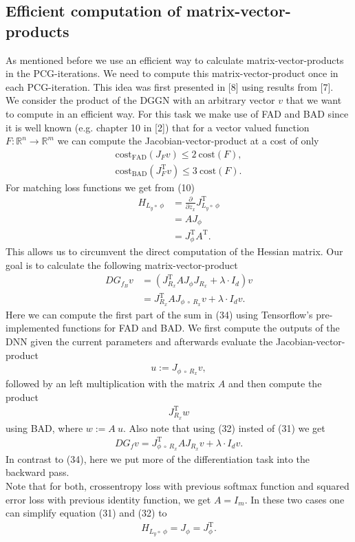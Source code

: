 \documentclass[conference]{IEEEtran}
\begin{document}
	\subsection{Efficient computation of matrix-vector-products}
	\noindent
	As mentioned before we use an efficient way to calculate matrix-vector-products in the PCG-iterations. We need to compute this matrix-vector-product once in each PCG-iteration. This idea was first presented in [8] using results from [7].\\
	We consider the product of the DGGN with an arbitrary vector $v$ that we want to compute in an efficient way.
	For this task we make use of FAD and BAD since it is well known (e.g. chapter 10 in [2]) that for a vector valued function $F:\mathbb{R}^{n}\rightarrow\mathbb{R}^{m}$ we can compute the Jacobian-vector-product at a cost of only
	\begin{align}
	\mathrm{cost}_{\text{FAD}}(J_{F}v)\leq 2\:\mathrm{cost}(F),\\
	\mathrm{cost}_{\text{BAD}}(J_{F}^{\mathrm{T}}v)\leq 3\:\mathrm{cost}(F).
	\end{align}
	For matching loss functions we get from (10)
	\begin{align}
	H_{L_{y}\circ\:\phi} &= \frac{\partial}{\partial z_{x}}J_{L_{y}\circ\:\phi}^{\mathrm{T}}\\
	&= AJ_{\phi} \\
	&= J_{\phi}^{\mathrm{T}}A^{\mathrm{T}}.
	\end{align}
	This allows us to circumvent the direct computation of the Hessian matrix. Our goal is to calculate the following matrix-vector-product
	\begin{align}
	DG_{f_{B}}v &=  \left(J_{R_{x}}^{\mathrm{T}}AJ_{\phi}J_{R_{x}} + \lambda\cdot I_{d}\right)v\\
	&= J_{R_{x}}^{\mathrm{T}}AJ_{\phi\:\circ\: R _{x}}v + \lambda\cdot I_{d}v.
	\end{align}
	Here we can compute the first part of the sum in (34) using Tensorflow's pre-implemented functions for FAD and BAD. We first compute the outputs of the DNN given the current parameters and afterwards evaluate the Jacobian-vector-product
	\begin{align}
	u := J_{\phi\:\circ\: R _{x}}v,
	\end{align}
	followed by an left multiplication with the matrix $A$ and then compute the product
	\begin{align}
	J_{R_{x}}^{\mathrm{T}}w
	\end{align}
	using BAD, where $w := A\:u$. Also note that using (32) insted of (31) we get
	\begin{align}
	DG_{f}v  = J_{\phi\:\circ\:R _{x}}^{\mathrm{T}}AJ_{R _{x}}v + \lambda\cdot I_{d}v.
	\end{align}
	In contrast to (34), here we put more of the differentiation task into the backward pass.\\
	Note that for both, crossentropy loss with previous softmax function and squared error loss with previous identity function, we get $A = I_{m}$. In these two cases one can simplify equation (31) and (32) to
	\begin{align}
	H_{L_{y}\circ\:\phi} = J_{\phi} = J_{\phi}^{\mathrm{T}}.
	\end{align}
\end{document}
